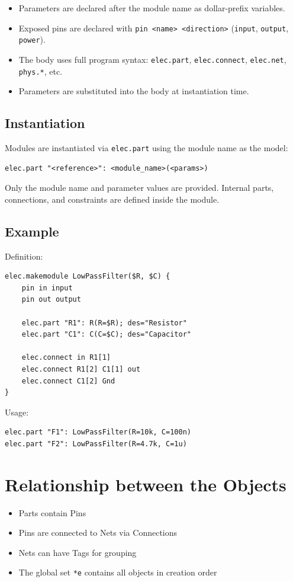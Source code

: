 \begin{itemize}
\item Parameters are declared after the module name as dollar-prefix variables.
\item Exposed pins are declared with \texttt{pin <name> <direction>} (\texttt{input}, \texttt{output}, \texttt{power}).
\item The body uses full program syntax: \texttt{elec.part}, \texttt{elec.connect}, \texttt{elec.net}, \texttt{phys.*}, etc.
\item Parameters are substituted into the body at instantiation time.
\end{itemize}

\subsection{Instantiation}
Modules are instantiated via \texttt{elec.part} using the module name as the model:
\begin{verbatim}
elec.part "<reference>": <module_name>(<params>)
\end{verbatim}

Only the module name and parameter values are provided. Internal parts, connections, and constraints are defined inside the module.

\subsection{Example}

Definition:
\begin{verbatim}
elec.makemodule LowPassFilter($R, $C) {
    pin in input
    pin out output
    
    elec.part "R1": R(R=$R); des="Resistor"
    elec.part "C1": C(C=$C); des="Capacitor"
    
    elec.connect in R1[1]
    elec.connect R1[2] C1[1] out
    elec.connect C1[2] Gnd
}
\end{verbatim}

Usage:
\begin{verbatim}
elec.part "F1": LowPassFilter(R=10k, C=100n)
elec.part "F2": LowPassFilter(R=4.7k, C=1u)
\end{verbatim}

\section{Relationship between the Objects}
\begin{itemize}
\item Parts contain Pins
\item Pins are connected to Nets via Connections
\item Nets can have Tags for grouping
\item The global set \texttt{*e} contains all objects in creation order
\end{itemize}


